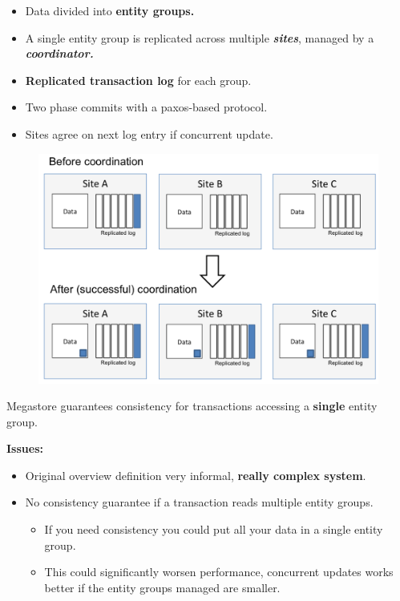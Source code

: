 \documentclass{beamer}
\begin{document}
\begin{frame}
    \begin{itemize}
        \item Data divided into \textbf{entity groups.} 
        \item A single entity group is replicated across multiple \textbf{\emph{sites}}, managed by a \emph{\textbf{coordinator.}}
        \item \textbf{Replicated transaction log}  for each group.
        \item Two phase commits with a paxos-based protocol.
        \item Sites agree on next log entry if concurrent update.
    \end{itemize}
    \begin{figure}
        \includegraphics[width=\textwidth, height=.6\textheight,keepaspectratio]{img/paxos.png}
    \end{figure}
\end{frame}
\begin{frame}
    
    \large
    Megastore  guarantees consistency for transactions accessing a \textbf{single} entity group.

    \bigskip
    \textbf{Issues:}
    \begin{itemize}
        \item Original overview definition very informal, \textbf{really complex system}.
        \item No consistency guarantee if a transaction reads multiple entity groups.
        \begin{itemize}
            \item If you need consistency you could put all your data in a single entity group. 
            \item This could significantly worsen performance, concurrent updates works better 
            if the entity groups managed are smaller.
        \end{itemize}
    \end{itemize}
    
\end{frame}
\end{document}
